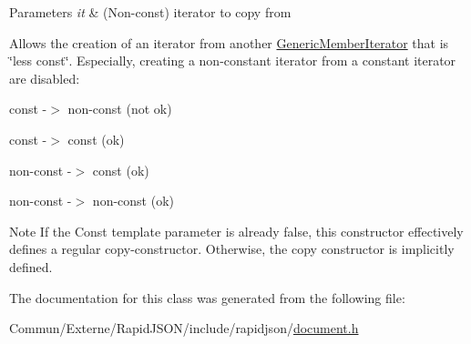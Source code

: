 \begin{DoxyParams}{Parameters}
{\em it} & (Non-\/const) iterator to copy from\\
\hline
\end{DoxyParams}
Allows the creation of an iterator from another \hyperlink{class_generic_member_iterator}{Generic\+Member\+Iterator} that is \char`\"{}less const\char`\"{}. Especially, creating a non-\/constant iterator from a constant iterator are disabled\+: \begin{DoxyItemize}
\item const -\/$>$ non-\/const (not ok) \item const -\/$>$ const (ok) \item non-\/const -\/$>$ const (ok) \item non-\/const -\/$>$ non-\/const (ok)\end{DoxyItemize}
\begin{DoxyNote}{Note}
If the {\ttfamily Const} template parameter is already {\ttfamily false}, this constructor effectively defines a regular copy-\/constructor. Otherwise, the copy constructor is implicitly defined. 
\end{DoxyNote}


The documentation for this class was generated from the following file\+:\begin{DoxyCompactItemize}
\item 
Commun/\+Externe/\+Rapid\+J\+S\+O\+N/include/rapidjson/\hyperlink{document_8h}{document.\+h}\end{DoxyCompactItemize}
